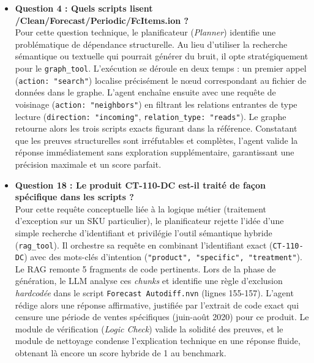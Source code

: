 \begin{itemize}
    \item \textbf{Question 4 : Quels scripts lisent /Clean/Forecast/Periodic/FcItems.ion ?}\\
    Pour cette question technique, le planificateur (\textit{Planner}) identifie une problématique de dépendance structurelle. Au lieu d'utiliser la recherche sémantique ou textuelle qui pourrait générer du bruit, il opte stratégiquement pour le \texttt{graph\_tool}. L'exécution se déroule en deux temps : un premier appel (\texttt{action: "search"}) localise précisément le nœud correspondant au fichier de données dans le graphe. L'agent enchaîne ensuite avec une requête de voisinage (\texttt{action: "neighbors"}) en filtrant les relations entrantes de type lecture (\texttt{direction: "incoming"}, \texttt{relation\_type: "reads"}). Le graphe retourne alors les trois scripts exacts figurant dans la référence. Constatant que les preuves structurelles sont irréfutables et complètes, l'agent valide la réponse immédiatement sans exploration supplémentaire, garantissant une précision maximale et un score parfait.
    
    \item \textbf{Question 18 : Le produit CT-110-DC est-il traité de façon spécifique dans les scripts ?}\\
    Pour cette requête conceptuelle liée à la logique métier (traitement d'exception sur un SKU particulier), le planificateur rejette l'idée d'une simple recherche d'identifiant et privilégie l'outil sémantique hybride (\texttt{rag\_tool}). Il orchestre sa requête en combinant l'identifiant exact (\texttt{CT-110-DC}) avec des mots-clés d'intention (\texttt{"product", "specific", "treatment"}). Le RAG remonte 5 fragments de code pertinents. Lors de la phase de génération, le LLM analyse ces \textit{chunks} et identifie une règle d'exclusion \textit{hardcodée} dans le script \texttt{Forecast Autodiff.nvn} (lignes 155-157). L'agent rédige alors une réponse affirmative, justifiée par l'extrait de code exact qui censure une période de ventes spécifiques (juin-août 2020) pour ce produit. Le module de vérification (\textit{Logic Check}) valide la solidité des preuves, et le module de nettoyage condense l'explication technique en une réponse fluide, obtenant là encore un score hybride de 1 au benchmark.


\end{itemize}
